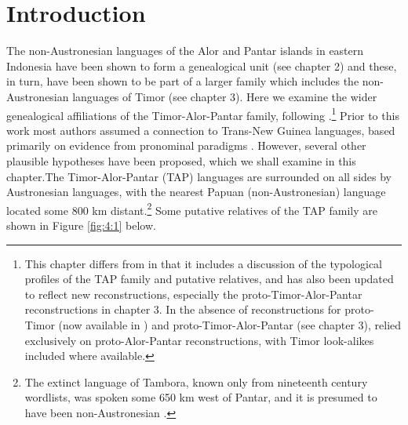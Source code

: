 
 

\section{Introduction} \label{sec:4:1}

\hypertarget{Toc376958109}{}The non-Austronesian languages of the Alor and Pantar islands in eastern Indonesia have been shown to form a genealogical unit (see chapter 2) and these, in turn, have been shown to be part of a larger family which includes the non-Austronesian languages of Timor (see chapter 3). Here we examine the wider genealogical affiliations of the Timor-Alor-Pantar family, following \citet{RobinsonEtAl2012reassessing}.\footnote{This chapter differs from \citet{RobinsonEtAl2012reassessing} in that it includes a discussion of the typological profiles of the TAP family and putative relatives, and has also been updated to reflect new reconstructions, especially the proto-Timor-Alor-Pantar reconstructions in chapter 3. In the absence of reconstructions for proto-Timor (now available in \citealt{SchapperEtAl2012historical}) and proto-Timor-Alor-Pantar (see chapter 3), \citet{RobinsonEtAl2012reassessing} relied exclusively on proto-Alor-Pantar reconstructions, with Timor look-alikes included
where available. }
Prior to this work most authors assumed a connection to Trans-New Guinea languages, based primarily on evidence from pronominal paradigms \citep{Ross2005}. However, several other plausible hypotheses have been proposed, which we shall examine in this chapter.The Timor-Alor-Pantar (TAP) languages are surrounded on all sides by Austronesian languages, with the nearest Papuan (non-Austronesian) language located some 800 km distant.\footnote{The extinct language of Tambora, known only from nineteenth century wordlists, was spoken some 650 km west of Pantar, and it is presumed to have been non-Austronesian \citep{Donohue2007tambora}.} Some putative relatives of the TAP family are shown in Figure \ref{fig:4:1} below.

